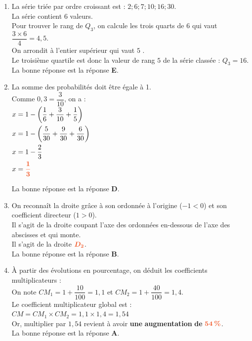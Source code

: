 \documentclass[a4paper,11pt]{article}
\newcounter{seancenum}
\newcounter{seancenumD}
\begin{document}
\setcounter{seancenumD}{28}
\newpage
\begin{seanceD}{} %

\begin{enumerate}
\item La série triée par ordre croissant est : $2  ;  6  ;  7  ;  10  ;  16  ;  30$.\\La série contient $6$ valeurs.\\
      Pour trouver le rang de $Q_3$, on calcule les trois quarts de $6$ qui vaut
       $\dfrac{3\times6}{4}=4{,}5$.\\On arrondit à l'entier supérieur qui vaut $5$ .\\ Le troisième quartile est donc la valeur de rang $5$ de la série classée : $Q_3=16$.\\La bonne réponse est la réponse {\bfseries \color[HTML]{F15929}E}.

\item La somme des probabilités doit être égale à 1.  \\Comme $0{,}3=\dfrac{3}{10}$, on a : \\
        $\begin{aligned}
        x&=1-\left(\dfrac{1}{6}+\dfrac{3}{10}+\dfrac{1}{5}\right)\\
        x&=1-\left(\dfrac{5}{30}+\dfrac{9}{30}+\dfrac{6}{30}\right)\\
        x&=1-\dfrac{2}{3}\\
        x&={\color[HTML]{F15929}\boldsymbol{\dfrac{1}{3}}}
        \end{aligned}$ 

\medskip
La bonne réponse est la réponse {\bfseries \color[HTML]{F15929}D}.

\item On reconnaît la droite grâce à son ordonnée à l'origine ($-1<0$) et son coefficient directeur ($1>0$).\\
    Il s'agit de la droite coupant l'axe des ordonnées en-dessous de l'axe des abscisses et qui monte.\\
    Il s'agit de la droite ${\color[HTML]{F15929}\boldsymbol{D_2}}$.\\La bonne réponse est la réponse {\bfseries \color[HTML]{F15929}B}.

\item À partir des évolutions en pourcentage, on déduit les coefficients multiplicateurs : \\On note $CM_1 = 1 + \dfrac{10}{100}=1{,}1$ et $CM_2 = 1 + \dfrac{40}{100}=1{,}4$.\\ Le coefficient multiplicateur global est : \\ $CM = CM_1 \times CM_2 = 1{,}1 \times 1{,}4 = 1{,}54$ \\Or, multiplier par $1{,}54$ revient à avoir {\bfseries \color[HTML]{F15929}une} {\bfseries \color[HTML]{F15929}augmentation} {\bfseries \color[HTML]{F15929}de} ${\color[HTML]{F15929}\boldsymbol{54\,\%}}$.\\La bonne réponse est la réponse {\bfseries \color[HTML]{F15929}A}.


\end{enumerate}
\end{seanceD}
\end{document}
